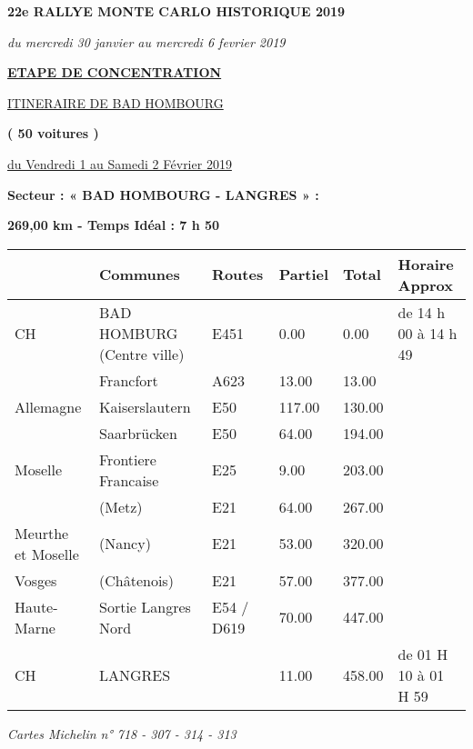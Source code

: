 \documentclass{article}%
\begin{document}
%
\normalsize%
\begin{center} \textbf{\LARGE{22e RALLYE MONTE CARLO HISTORIQUE 2019}} \end{center}%
\begin{flushleft} \textit{du mercredi 30 janvier au mercredi 6 fevrier 2019} \end{flushleft}%
\begin{center} \textbf{\underline{ETAPE DE CONCENTRATION}} \end{center}%
\begin{center} \underline{ITINERAIRE DE BAD HOMBOURG} \end{center}%
\begin{center} \textbf{( 50 voitures )} \end{center}%
\begin{flushright} \underline{du  Vendredi 1 au Samedi 2 Février 2019} \end{flushright}%
\begin{flushleft} \textbf{Secteur : « BAD HOMBOURG - LANGRES  » :
} \end{flushleft}%
\begin{flushright} \textbf{269,00 km - Temps Idéal : 7 h 50} \end{flushright}%
\begin{longtable}{p{2.25cm}|p{7.0cm}|p{1.5cm}|p{1.5cm}|p{1.5cm}|p{3.5cm}}%
\hline%
&Communes&Routes&Partiel&Total&Horaire Approx\\%
\hline%
\endhead%
\endfoot%
\endlastfoot%
﻿CH&BAD HOMBURG                        (Centre ville)&E451&0.00&0.00&de 14 h 00 à 14 h 49\\%
&Francfort&A623&13.00&13.00&\\%
Allemagne&Kaiserslautern &E50 &117.00&130.00&\\%
&Saarbrücken&E50 &64.00&194.00&\\%
Moselle&Frontiere Francaise&E25&9.00&203.00&\\%
&(Metz)&E21 &64.00&267.00&\\%
 Meurthe et Moselle&(Nancy) &E21 &53.00&320.00&\\%
Vosges &(Châtenois)&E21 &57.00&377.00&\\%
Haute{-}Marne&Sortie Langres Nord&E54 / D619&70.00&447.00&\\%
                                CH&LANGRES&&11.00&458.00&de 01 H 10 à 01 H 59\\%
\hline%
\end{longtable}%
\begin{flushleft} \textit{Cartes Michelin n° 718 - 307 - 314 - 313
} \end{flushleft}%
\end{document}
